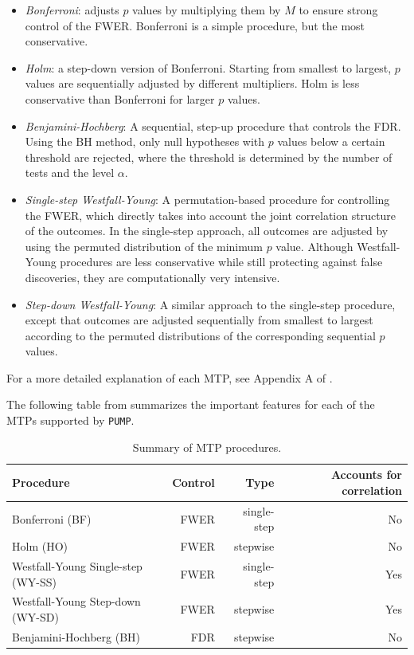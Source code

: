 \documentclass[
]{jss}
\providecommand{\tightlist}{%
  \setlength{\itemsep}{0pt}\setlength{\parskip}{0pt}}
\begin{document}
\begin{itemize}
\tightlist
\item
  \emph{Bonferroni}: adjusts \(p\) values by multiplying them by \(M\)
  to ensure strong control of the FWER. Bonferroni is a simple
  procedure, but the most conservative.
\item
  \emph{Holm}: a step-down version of Bonferroni. Starting from smallest
  to largest, \(p\) values are sequentially adjusted by different
  multipliers. Holm is less conservative than Bonferroni for larger
  \(p\) values.
\item
  \emph{Benjamini-Hochberg}: A sequential, step-up procedure that
  controls the FDR. Using the BH method, only null hypotheses with \(p\)
  values below a certain threshold are rejected, where the threshold is
  determined by the number of tests and the level \(\alpha\).
\item
  \emph{Single-step Westfall-Young}: A permutation-based procedure for
  controlling the FWER, which directly takes into account the joint
  correlation structure of the outcomes. In the single-step approach,
  all outcomes are adjusted by using the permuted distribution of the
  minimum \(p\) value. Although Westfall-Young procedures are less
  conservative while still protecting against false discoveries, they
  are computationally very intensive.
\item
  \emph{Step-down Westfall-Young}: A similar approach to the single-step
  procedure, except that outcomes are adjusted sequentially from
  smallest to largest according to the permuted distributions of the
  corresponding sequential \(p\) values.
\end{itemize}

For a more detailed explanation of each MTP, see Appendix A of
\citet{Porter2018}.

The following table from \citet{Porter2018} summarizes the important
features for each of the MTPs supported by \texttt{PUMP}.

\begin{table}[h!]
\centering
\begin{tabular}{l r r r}
\toprule
Procedure                             & Control & Type                    & Accounts for correlation \\ \midrule
Bonferroni (BF)                       & FWER    & single-step             & No                       \\
Holm (HO)                             & FWER    & stepwise                & No\\
Westfall-Young Single-step (WY-SS)    & FWER    & single-step             & Yes\\
Westfall-Young Step-down (WY-SD)      & FWER    & stepwise                & Yes\\
Benjamini-Hochberg (BH)               & FDR     & stepwise                & No \\
\bottomrule
\end{tabular}
\caption{Summary of MTP procedures.}
  \label{tab:mtp}
\end{table}
\end{document}
